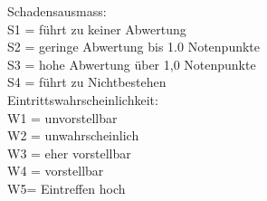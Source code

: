 Schadensausmass: \\
S1 = führt zu keiner Abwertung \\
S2 = geringe Abwertung bis 1.0 Notenpunkte \\
S3 = hohe Abwertung über 1,0 Notenpunkte \\
S4 = führt zu Nichtbestehen \\
\newline
Eintrittswahrscheinlichkeit: \\
W1 = unvorstellbar \\
W2 = unwahrscheinlich \\
W3 = eher vorstellbar \\
W4 = vorstellbar \\
W5= Eintreffen hoch \\

\restoregeometry
\riskvalues
\newpage
